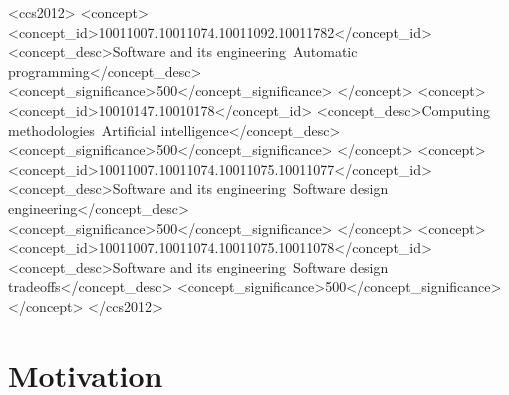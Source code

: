 \documentclass[sigconf]{acmart}
\theoremstyle{definition}
\begin{document}
\begin{CCSXML}
<ccs2012>
   <concept>
       <concept_id>10011007.10011074.10011092.10011782</concept_id>
       <concept_desc>Software and its engineering~Automatic programming</concept_desc>
       <concept_significance>500</concept_significance>
       </concept>
   <concept>
       <concept_id>10010147.10010178</concept_id>
       <concept_desc>Computing methodologies~Artificial intelligence</concept_desc>
       <concept_significance>500</concept_significance>
       </concept>
   <concept>
       <concept_id>10011007.10011074.10011075.10011077</concept_id>
       <concept_desc>Software and its engineering~Software design engineering</concept_desc>
       <concept_significance>500</concept_significance>
       </concept>
   <concept>
       <concept_id>10011007.10011074.10011075.10011078</concept_id>
       <concept_desc>Software and its engineering~Software design tradeoffs</concept_desc>
       <concept_significance>500</concept_significance>
       </concept>
 </ccs2012>
\end{CCSXML}





\maketitle

\section{Motivation}\label{sec:motivation}
\end{document}
